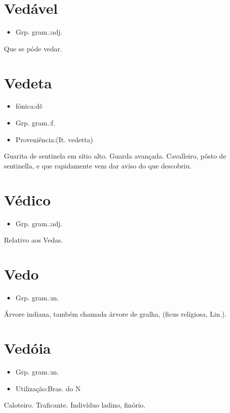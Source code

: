 \documentclass{article}
\begin{document}
\section{Vedável}
\begin{itemize}
\item {Grp. gram.:adj.}
\end{itemize}
Que se póde vedar.
\section{Vedeta}
\begin{itemize}
\item {fónica:dê}
\end{itemize}
\begin{itemize}
\item {Grp. gram.:f.}
\end{itemize}
\begin{itemize}
\item {Proveniência:(It. \textunderscore vedetta\textunderscore )}
\end{itemize}
Guarita de sentinela em sítio alto.
Guarda avançada.
Cavalleiro, pôsto de sentinella, e que rapidamente vem dar aviso do que descobriu.
\section{Védico}
\begin{itemize}
\item {Grp. gram.:adj.}
\end{itemize}
Relativo aos Vedas.
\section{Vedo}
\begin{itemize}
\item {Grp. gram.:m.}
\end{itemize}
Árvore indiana, também chamada \textunderscore árvore de gralha\textunderscore , (\textunderscore ficus religiosa\textunderscore , Lin.).
\section{Vedóia}
\begin{itemize}
\item {Grp. gram.:m.}
\end{itemize}
\begin{itemize}
\item {Utilização:Bras. do N}
\end{itemize}
Caloteiro.
Traficante.
Indivíduo ladino, finório.
\end{document}

